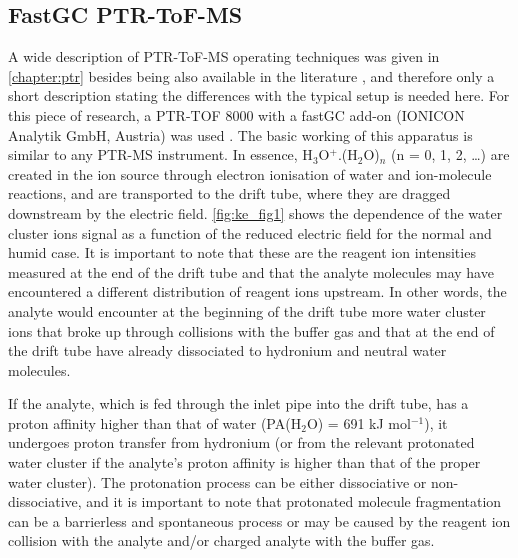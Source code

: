 \subsection{FastGC PTR-ToF-MS}
A wide description of PTR-ToF-MS operating techniques was given in \autoref{chapter:ptr} besides being also available in the literature \cite{ellis2013proton}, and therefore only a short description stating the differences with the typical setup is needed here.
For this piece of research,  a PTR-TOF 8000 with a fastGC add-on (IONICON Analytik GmbH, Austria) was used \cite{GRAUS20101037,jordan2009online}.
The basic working of this apparatus is similar to any PTR-MS instrument. In essence, H$_3$O$^+$.(H$_2$O)$_n$ (n = 0, 1, 2, …) are created in the ion source through electron ionisation of water and ion-molecule reactions, and are transported to the drift tube, where they are dragged downstream by the electric field. \autoref{fig:ke_fig1} shows the dependence of the water cluster ions signal as a function of the reduced electric field for the normal and humid case.
It is important to note that these are the reagent ion intensities measured at the end of the drift tube and that the analyte molecules may have encountered a different distribution of reagent ions upstream. In other words, the analyte would encounter at the beginning of the drift tube more water cluster ions that broke up through collisions with the buffer gas  and that at the end of the drift tube have already dissociated to hydronium and neutral water molecules.



If the analyte, which is fed through the inlet pipe into the drift tube, has a proton affinity higher than that of water (PA(H$_2$O) = 691 kJ mol$^{-1}$), it undergoes proton transfer from hydronium (or from the relevant protonated water cluster if the analyte's proton affinity is higher than that of the proper water cluster).
The protonation process can be either dissociative or non-dissociative, and it is important to note that protonated molecule fragmentation can be a barrierless and spontaneous process or may be caused by the reagent ion collision with the analyte and/or charged analyte with the buffer gas.






